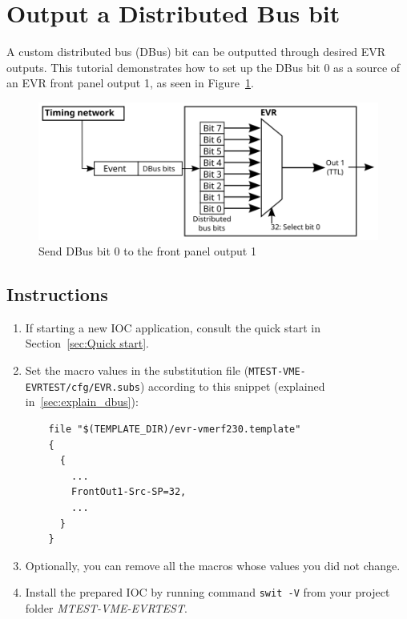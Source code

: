 \documentclass[12pt,a4paper]{article}
\begin{document}
\section{Output a Distributed Bus bit}
A custom distributed bus (DBus) bit can be outputted through desired EVR outputs. This tutorial demonstrates how to set up the DBus bit 0 as a source of an EVR front panel output 1, as seen in Figure~\ref{fig:dbus}. 

\begin{figure}[H]
	\centering
	\includegraphics[]{./img/dbus}
	\caption{Send DBus bit 0 to the front panel output 1}
	\label{fig:dbus}
\end{figure}

\subsection{Instructions}
\begin{enumerate}
	\item If starting a new IOC application, consult the quick start in Section~\ref{sec:Quick start}.
	
	\item Set the macro values in the substitution file (\texttt{MTEST-VME-EVRTEST/cfg/EVR.subs}) according to this snippet (explained in~\ref{sec:explain_dbus}):
\begin{verbatim}
	file "$(TEMPLATE_DIR)/evr-vmerf230.template"
	{
	  {
	    ...
	    FrontOut1-Src-SP=32,
	    ...
	  }
	}
\end{verbatim}

	\item Optionally, you can remove all the macros whose values you did not change. 
	\item Install the prepared IOC by running command \texttt{swit -V} from your project folder \textit{MTEST-VME-EVRTEST}.
\end{enumerate}
\end{document}
